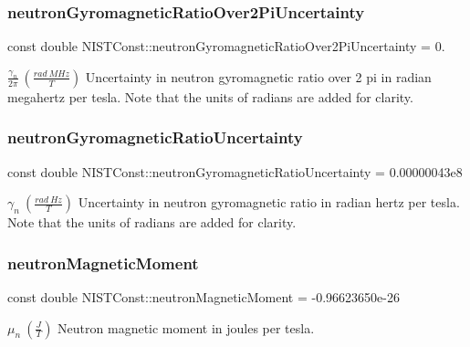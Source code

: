 \subsubsection{\texorpdfstring{neutron\+Gyromagnetic\+Ratio\+Over2\+Pi\+Uncertainty}{neutronGyromagneticRatioOver2PiUncertainty}}
{\footnotesize\ttfamily const double N\+I\+S\+T\+Const\+::neutron\+Gyromagnetic\+Ratio\+Over2\+Pi\+Uncertainty = 0.}

$\frac{\gamma_n}{2\pi} \ (\frac{rad\ MHz}{T})$ Uncertainty in neutron gyromagnetic ratio over 2 pi in radian megahertz per tesla. Note that the units of radians are added for clarity. \mbox{\label{group___neutron_ga4f48bb36482cdd64b95e17e52939df96}} 
\subsubsection{\texorpdfstring{neutron\+Gyromagnetic\+Ratio\+Uncertainty}{neutronGyromagneticRatioUncertainty}}
{\footnotesize\ttfamily const double N\+I\+S\+T\+Const\+::neutron\+Gyromagnetic\+Ratio\+Uncertainty = 0.\+00000043e8}

$\gamma_n \ (\frac{rad\ Hz}{T})$ Uncertainty in neutron gyromagnetic ratio in radian hertz per tesla. Note that the units of radians are added for clarity. \mbox{\label{group___neutron_ga42a101bcaf7105edbfd6c06de9633d22}} 
\subsubsection{\texorpdfstring{neutron\+Magnetic\+Moment}{neutronMagneticMoment}}
{\footnotesize\ttfamily const double N\+I\+S\+T\+Const\+::neutron\+Magnetic\+Moment = -\/0.\+96623650e-\/26}

$\mu_n \ (\frac{J}{T})$ Neutron magnetic moment in joules per tesla. \mbox{\label{group___neutron_ga01b6142f2d5dd4cd6ff10d2938a312cf}} 
